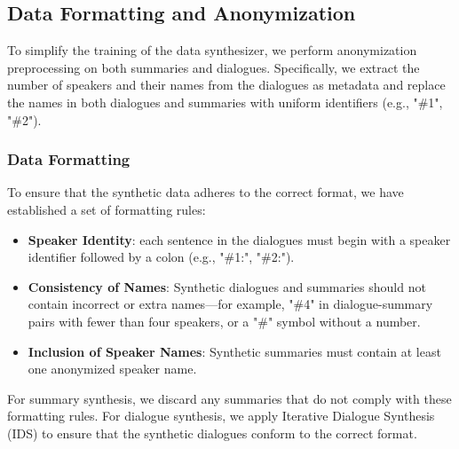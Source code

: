 \subsection{Data Formatting and Anonymization}

To simplify the training of the data synthesizer, we perform anonymization preprocessing on both summaries and dialogues. Specifically, we extract the number of speakers and their names from the dialogues as metadata and replace the names in both dialogues and summaries with uniform identifiers (e.g., "\#1", "\#2").

\subsubsection{Data Formatting}
\label{sec:format}
To ensure that the synthetic data adheres to the correct format, we have established a set of formatting rules:

\begin{itemize}[label=-, topsep=0pt, itemsep=1pt, parsep=0pt, partopsep=0pt]
\item \textbf{Speaker Identity}: each sentence in the dialogues must begin with a speaker identifier followed by a colon (e.g., "\#1:", "\#2:").
\item \textbf{Consistency of Names}: Synthetic dialogues and summaries should not contain incorrect or extra names—for example, "\#4" in dialogue-summary pairs with fewer than four speakers, or a "\#" symbol without a number.
\item \textbf{Inclusion of Speaker Names}: Synthetic summaries must contain at least one anonymized speaker name.
\end{itemize}

For summary synthesis, we discard any summaries that do not comply with these formatting rules. For dialogue synthesis, we apply Iterative Dialogue Synthesis (IDS) to ensure that the synthetic dialogues conform to the correct format.



